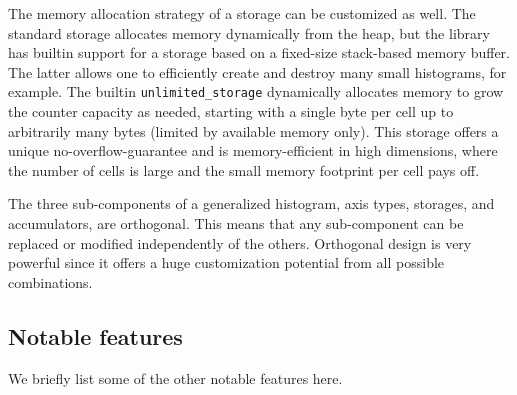 \documentclass{webofc}
\begin{document}
\begin{description}
The memory allocation strategy of a storage can be customized as well. The standard storage allocates memory dynamically from the heap, but the library has builtin support for a storage based on a fixed-size stack-based memory buffer. The latter allows one to efficiently create and destroy many small histograms, for example. The builtin \verb|unlimited_storage| dynamically allocates memory to grow the counter capacity as needed, starting with a single byte per cell up to arbitrarily many bytes (limited by available memory only). This storage offers a unique no-overflow-guarantee and is memory-efficient in high dimensions, where the number of cells is large and the small memory footprint per cell pays off.
\end{description}

The three sub-components of a generalized histogram, axis types, storages, and accumulators, are orthogonal. This means that any sub-component can be replaced or modified independently of the others. Orthogonal design is very powerful since it offers a huge customization potential from all possible combinations.

\subsection{Notable features}
\label{sec-bh-cpp-feat}

We briefly list some of the other notable features here.
\end{document}
